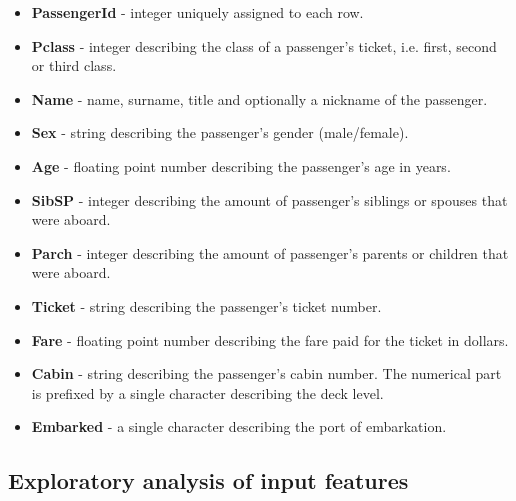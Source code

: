 \documentclass{article}
\begin{document}
\begin{itemize}
\item \textbf{PassengerId} - integer uniquely assigned to each row.
\item \textbf{Pclass} - integer describing the class of a passenger's ticket, i.e. first, second or third class.          
\item \textbf{Name} - name, surname, title and optionally a nickname of the passenger.
\item \textbf{Sex} - string describing the passenger's gender (male/female). 
\item \textbf{Age} - floating point number describing the passenger's age in years.     \item \textbf{SibSP} - integer describing the amount of passenger's siblings or spouses that were aboard.
\item \textbf{Parch} - integer describing the amount of passenger's parents or children that were aboard.     
\item \textbf{Ticket} - string describing the passenger's ticket number.
\item \textbf{Fare} - floating point number describing the fare paid for the ticket in dollars.
\item \textbf{Cabin} - string describing the passenger's cabin number. The numerical part is prefixed by a single character describing the deck level.
\item \textbf{Embarked} - a single character describing the port of embarkation.
\end{itemize}

\newpage
\subsection{Exploratory analysis of input features}
\end{document}
